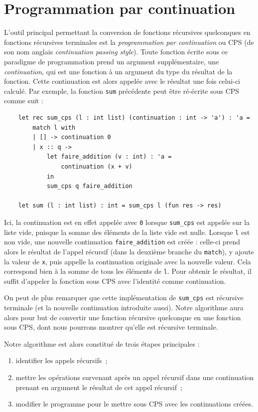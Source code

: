 \section{Programmation par continuation}

L'outil principal permettant la conversion de fonctions récursives quelconques
en fonctions récursives terminales est la
\textit{programmation par continuation} ou CPS (de son nom anglais
\textit{continuation passing style}). Toute fonction écrite sous ce paradigme de
programmation prend un argument supplémentaire, une \textit{continuation}, qui
est une fonction à un argument du type du résultat de la fonction. Cette
continuation est alors appelée avec le résultat une fois celui-ci calculé. Par
exemple, la fonction \texttt{sum} précédente peut être ré-écrite sous CPS comme
suit :

\small
\begin{verbatim}
    let rec sum_cps (l : int list) (continuation : int -> 'a') : 'a =
        match l with
        | [] -> continuation 0
        | x :: q ->
            let faire_addition (v : int) : 'a =
                continuation (x + v)
            in
            sum_cps q faire_addition

    let sum (l : int list) : int = sum_cps l (fun res -> res)
\end{verbatim}
\normalsize

Ici, la continuation est en effet appelée avec \texttt{0} lorsque
\texttt{sum\_cps} est appelée sur la liste vide, puisque la somme des éléments
de la liste vide est nulle. Lorsque \texttt{l} est non vide, une nouvelle
continuation \texttt{faire\_addition} est créée : celle-ci prend alors le
résultat de l'appel récursif (dans la deuxième branche du \texttt{match}), y
ajoute la valeur de \texttt{x}, puis appelle la continuation originale avec la
nouvelle valeur. Cela correspond bien à la somme de tous les éléments de
\texttt{l}. Pour obtenir le résultat, il suffit d'appeler la fonction sous CPS
avec l'identité comme continuation.

On peut de plus remarquer que cette implémentation de \texttt{sum\_cps}
est récursive terminale (et la nouvelle continuation introduite aussi). Notre
algorithme aura alors pour but de convertir une fonction récursive quelconque en
une fonction sous CPS, dont nous pourrons montrer qu'elle est récursive
terminale.

Notre algorithme est alors constitué de trois étapes principales :
\begin{enumerate}
    \item identifier les appels récursifs~;
    \item mettre les opérations survenant après un appel récursif dans une
          continuation prenant en argument le résultat de cet appel récursif~;
    \item modifier le programme pour le mettre sous CPS avec les continuations
          créées.
\end{enumerate}
